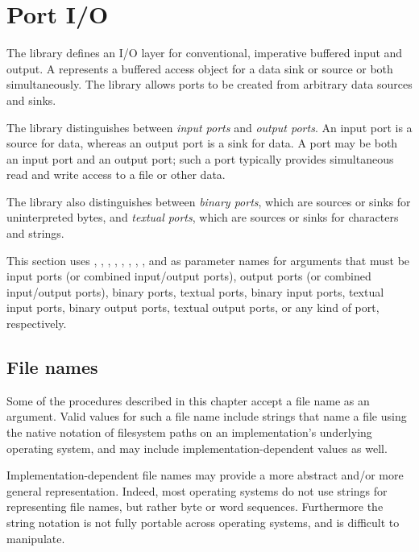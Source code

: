 \section{Port I/O}
\label{portsiosection}

The  library defines an I/O layer for
conventional, imperative buffered input and output.
A  represents a buffered access object
for a data sink or source or both simultaneously.
The library allows ports to be created from arbitrary data sources
and sinks.

The  library distinguishes between \textit{input
  ports} and \textit{output
  ports}.  An input port is a source for data,
whereas an output port is a sink for data.  A port may be both an
input port and an output port; such a port typically provides
simultaneous read and write access to a file or other data.

The  library also distinguishes between
\textit{binary ports}, which are sources
or sinks for uninterpreted bytes, and
\textit{textual ports}, which are sources
or sinks for characters and strings.

This section uses , ,
, ,
, ,
, ,
and  as
parameter names for arguments that must be input ports (or combined
input/output ports), output ports (or combined input/output ports),
binary ports, textual ports, binary input ports, textual input ports,
binary output ports, textual output ports, or any kind of port,
respectively.

\subsection{File names}
\label{filenamesection}

Some of the procedures described in this chapter accept a file name as an
argument. Valid values for such a file name include strings that name a file
using the native notation of filesystem paths on an implementation's
underlying operating system, and may include implementation-dependent
values as well.

\begin{rationale}
Implementation-dependent file names may provide a more
abstract and/or more general representation. Indeed, most operating
systems do not use strings for representing file names, but rather byte
or word sequences.
Furthermore the string notation is not fully portable across operating
systems, and is difficult to manipulate.
\end{rationale}

